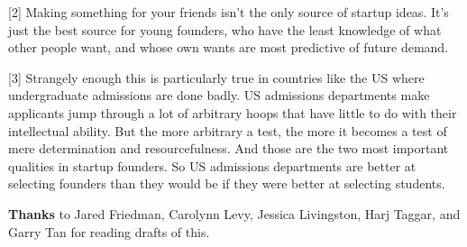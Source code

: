 {[}2{]} Making something for your friends isn't the only source of
startup ideas. It's just the best source for young founders, who have
the least knowledge of what other people want, and whose own wants are
most predictive of future demand.

{[}3{]} Strangely enough this is particularly true in countries like the
US where undergraduate admissions are done badly. US admissions
departments make applicants jump through a lot of arbitrary hoops that
have little to do with their intellectual ability. But the more
arbitrary a test, the more it becomes a test of mere determination and
resourcefulness. And those are the two most important qualities in
startup founders. So US admissions departments are better at selecting
founders than they would be if they were better at selecting students.

\textbf{Thanks} to Jared Friedman, Carolynn Levy, Jessica Livingston,
Harj Taggar, and Garry Tan for reading drafts of this.
